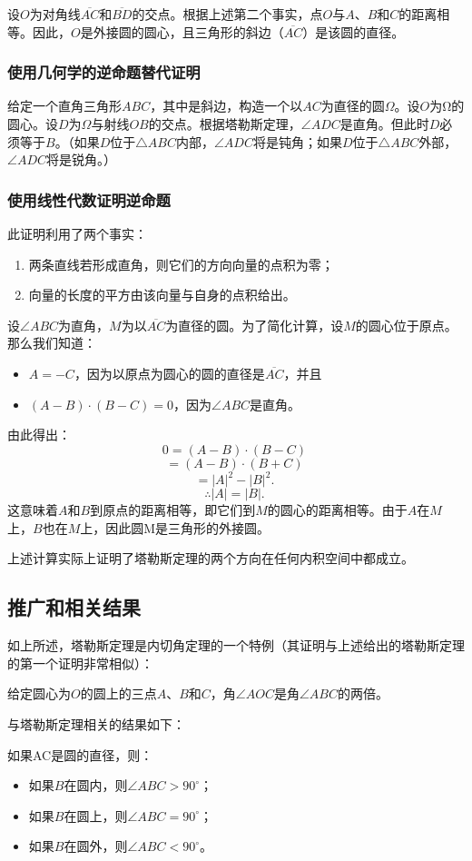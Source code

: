 设\(O\)为对角线\(\overline{AC}\)和\(\overline{BD}\)的交点。根据上述第二个事实，点\(O\)与\(A\)、\(B\)和\(C\)的距离相等。因此，\(O\)是外接圆的圆心，且三角形的斜边（\(\overline{AC}\)）是该圆的直径。
\subsubsection{使用几何学的逆命题替代证明} 
给定一个直角三角形\(ABC\)，其中是斜边，构造一个以\(AC\)为直径的圆\(\Omega\)。设\(O\)为Ω的圆心。设\(D\)为\(\Omega\)与射线\(OB\)的交点。根据塔勒斯定理，\(\angle ADC\)是直角。但此时\(D\)必须等于\(B\)。（如果\(D\)位于\(\triangle ABC\)内部，\(\angle ADC\)将是钝角；如果\(D\)位于\(\triangle ABC\)外部，\(\angle ADC\)将是锐角。）
\subsubsection{使用线性代数证明逆命题 } 
此证明利用了两个事实：
\begin{enumerate}
\item 两条直线若形成直角，则它们的方向向量的点积为零；
\item 向量的长度的平方由该向量与自身的点积给出。
\end{enumerate}
设\(\angle ABC\)为直角，\(M\)为以\(\overline{AC}\)为直径的圆。为了简化计算，设\(M\)的圆心位于原点。那么我们知道：
\begin{itemize}
\item \(A = -C\)，因为以原点为圆心的圆的直径是\(\overline{AC}\)，并且  
\item \((A - B) \cdot (B - C) = 0\)，因为\(\angle ABC\)是直角。
\end{itemize}
由此得出：
\[
0 = (A - B) \cdot (B - C)~
\]
\[
= (A - B) \cdot (B + C)~
\]
\[
= |A|^2 - |B|^2.~
\]
\[
\therefore |A| = |B|.~
\]
这意味着\(A\)和\(B\)到原点的距离相等，即它们到\(M\)的圆心的距离相等。由于\(A\)在\(M\)上，\( B\)也在\(M\)上，因此圆M是三角形的外接圆。

上述计算实际上证明了塔勒斯定理的两个方向在任何内积空间中都成立。
\subsection{推广和相关结果}  
如上所述，塔勒斯定理是内切角定理的一个特例（其证明与上述给出的塔勒斯定理的第一个证明非常相似）：

给定圆心为\(O\)的圆上的三点\(A\)、\(B\)和\(C\)，角\(\angle AOC\)是角\(\angle ABC\)的两倍。

与塔勒斯定理相关的结果如下：

如果AC是圆的直径，则：
\begin{itemize}
\item 如果\(B\)在圆内，则\(\angle ABC>90^\circ\)；
\item 如果\(B\)在圆上，则\(\angle ABC=90^\circ\)；
\item 如果\(B\)在圆外，则\(\angle ABC<90^\circ\)。
\end{itemize}